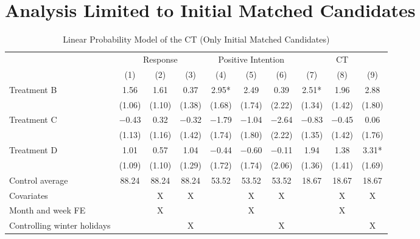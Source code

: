 \documentclass[12pt, a4paper]{article}
\begin{document}
\clearpage

\hypertarget{analysis-limited-to-initial-matched-candidates}{%
\section{Analysis Limited to Initial Matched Candidates}\label{analysis-limited-to-initial-matched-candidates}}

\begin{table}[H]

\caption{\label{tab:lm-reply-test-initial-matched}Linear Probability Model of the CT (Only Initial Matched Candidates)}
\centering
\fontsize{8}{10}\selectfont
\begin{threeparttable}
\begin{tabular}[t]{lccccccccc}
\toprule
\multicolumn{1}{c}{ } & \multicolumn{3}{c}{Response} & \multicolumn{3}{c}{Positive Intention} & \multicolumn{3}{c}{CT} \\
\cmidrule(l{3pt}r{3pt}){2-4} \cmidrule(l{3pt}r{3pt}){5-7} \cmidrule(l{3pt}r{3pt}){8-10}
  & (1) & (2) & (3) & (4) & (5) & (6) & (7) & (8) & (9)\\
\midrule
Treatment B & \num{1.56} & \num{1.61} & \num{0.37} & \num{2.95}* & \num{2.49} & \num{0.39} & \num{2.51}* & \num{1.96} & \num{2.88}\\
 & (\num{1.06}) & (\num{1.10}) & (\num{1.38}) & (\num{1.68}) & (\num{1.74}) & (\num{2.22}) & (\num{1.34}) & (\num{1.42}) & (\num{1.80})\\
Treatment C & \num{-0.43} & \num{0.32} & \num{-0.32} & \num{-1.79} & \num{-1.04} & \num{-2.64} & \num{-0.83} & \num{-0.45} & \num{0.06}\\
 & (\num{1.13}) & (\num{1.16}) & (\num{1.42}) & (\num{1.74}) & (\num{1.80}) & (\num{2.22}) & (\num{1.35}) & (\num{1.42}) & (\num{1.76})\\
Treatment D & \num{1.01} & \num{0.57} & \num{1.04} & \num{-0.44} & \num{-0.60} & \num{-0.11} & \num{1.94} & \num{1.38} & \num{3.31}*\\
 & (\num{1.09}) & (\num{1.10}) & (\num{1.29}) & (\num{1.72}) & (\num{1.74}) & (\num{2.06}) & (\num{1.36}) & (\num{1.41}) & (\num{1.69})\\
\midrule
Control average & 88.24 & 88.24 & 88.24 & 53.52 & 53.52 & 53.52 & 18.67 & 18.67 & 18.67\\
Covariates &  & X & X &  & X & X &  & X & X\\
Month and week FE &  & X &  &  & X &  &  & X & \\
Controlling winter holidays &  &  & X &  &  & X &  &  & X\\

\end{tabular}
\end{threeparttable}
\end{table}
\end{document}
